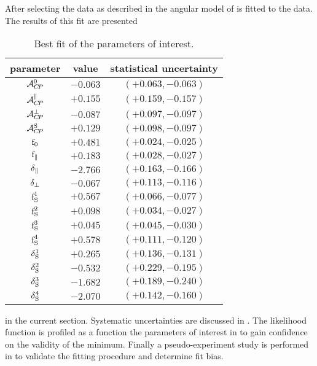 After selecting the data as described in  the angular model of  is fitted to the data.
The results of this fit are presented

\begin{table}[!h]
  \center
  \begin{tabular}{c c c}
    \hline
     parameter & value & statistical uncertainty \\
     \hline
     $             \mathcal{A}_{C\!P}^{0}$ & $-0.063$ & $(+0.063,-0.063)$ \\
     $     \mathcal{A}_{C\!P}^{\parallel}$ & $+0.155$ & $(+0.159,-0.157)$ \\
     $         \mathcal{A}_{C\!P}^{\perp}$ & $-0.087$ & $(+0.097,-0.097)$ \\
     $             \mathcal{A}_{C\!P}^{\rm S}$ & $+0.129$ & $(+0.098,-0.097)$ \\
     \hline
     $              \text{f}_{0}$ & $+0.481$ & $(+0.024,-0.025)$ \\
     $      \text{f}_{\parallel}$ & $+0.183$ & $(+0.028,-0.027)$ \\
     $\delta_{\parallel}$ & $-2.766$ & $(+0.163,-0.166)$ \\
     $    \delta_{\perp}$ & $-0.067$ & $(+0.113,-0.116)$ \\
     \hline
     $              \text{f}_{\text{S}}^{1}$ & $+0.567$ & $(+0.066,-0.077)$ \\
     $              \text{f}_{\text{S}}^{2}$ & $+0.098$ & $(+0.034,-0.027)$ \\
     $              \text{f}_{\text{S}}^{3}$ & $+0.045$ & $(+0.045,-0.030)$ \\
     $              \text{f}_{\text{S}}^{4}$ & $+0.578$ & $(+0.111,-0.120)$ \\
     $          \delta_{\text{S}}^{1}$ & $+0.265$ & $(+0.136,-0.131)$ \\
     $          \delta_{\text{S}}^{2}$ & $-0.532$ & $(+0.229,-0.195)$ \\
     $          \delta_{\text{S}}^{3}$ & $-1.682$ & $(+0.189,-0.240)$ \\
     $          \delta_{\text{S}}^{4}$ & $-2.070$ & $(+0.142,-0.160)$ \\
    \hline
  \end{tabular}
  \caption{\small Best fit of the parameters of interest.}
  \label{bestFitResult}
\end{table}

\noindent in the current section. Systematic uncertainties are discussed in .
The likelihood function is profiled as a function  the parameters of interest in  to gain confidence on the validity
of the minimum. Finally a pseudo-experiment study is performed in  to validate the fitting procedure
and determine fit bias.

